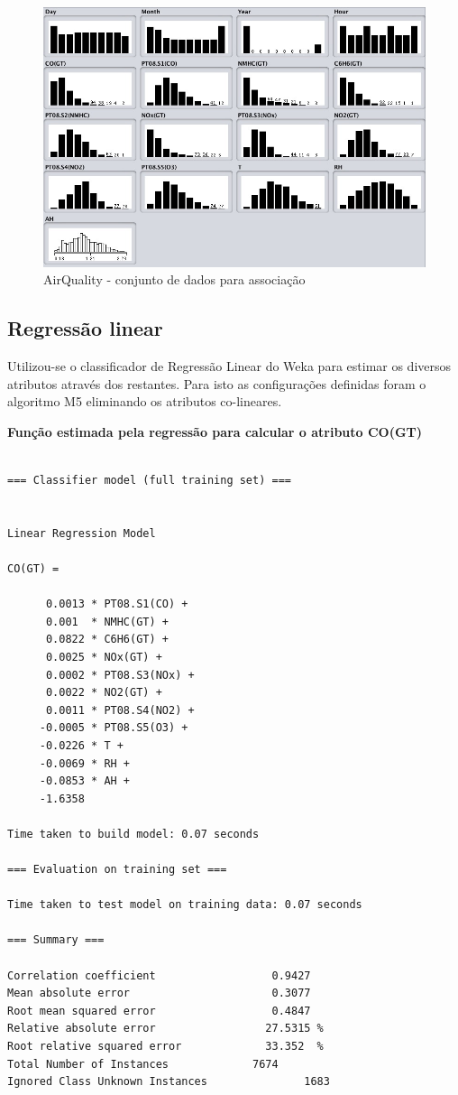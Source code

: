 \begin{figure}[H]
    \centering
    \includegraphics[scale=0.4]{tex/img/img3.jpg}
    \caption{AirQuality - conjunto de dados para associação}
    \label{fig:associacao}
\end{figure}

\newpage

\subsection{Regressão linear}

Utilizou-se o classificador de Regressão Linear do Weka para estimar os diversos atributos através dos restantes. Para isto as configurações definidas foram o algoritmo M5 eliminando os atributos co-lineares.

\textbf{Função estimada pela regressão para calcular o atributo CO(GT)}

\begin{lstlisting}[frame=single]

=== Classifier model (full training set) ===


Linear Regression Model

CO(GT) =

      0.0013 * PT08.S1(CO) +
      0.001  * NMHC(GT) +
      0.0822 * C6H6(GT) +
      0.0025 * NOx(GT) +
      0.0002 * PT08.S3(NOx) +
      0.0022 * NO2(GT) +
      0.0011 * PT08.S4(NO2) +
     -0.0005 * PT08.S5(O3) +
     -0.0226 * T +
     -0.0069 * RH +
     -0.0853 * AH +
     -1.6358

Time taken to build model: 0.07 seconds

=== Evaluation on training set ===

Time taken to test model on training data: 0.07 seconds

=== Summary ===

Correlation coefficient                  0.9427
Mean absolute error                      0.3077
Root mean squared error                  0.4847
Relative absolute error                 27.5315 %
Root relative squared error             33.352  %
Total Number of Instances             7674     
Ignored Class Unknown Instances               1683     

\end{lstlisting}
\newpage


